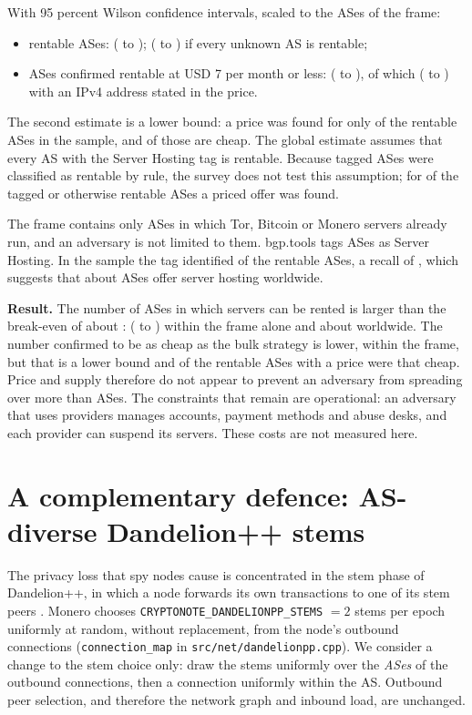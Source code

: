 \documentclass[english]{mrl}
\theoremstyle{plain}
\begin{document}
With 95 percent Wilson confidence intervals, scaled to the \svFrame{} ASes of the frame:
\begin{itemize}
\item rentable ASes: \svKR{} (\svKRLoLo{} to \svKRHiHi{}); \svKRU{} (\svKRULoLo{} to \svKRUHiHi{}) if every unknown AS is rentable;
\item ASes confirmed rentable at USD 7 per month or less: \svKCheap{} (\svKCheapLoLo{} to \svKCheapHiHi{}), of which \svKCheapV{} (\svKCheapVLoLo{} to \svKCheapVHiHi{}) with an IPv4 address stated in the price.
\end{itemize}
The second estimate is a lower bound: a price was found for only \svPriced{} of the \svR{} rentable ASes in the sample, and \svCheap{} of those \svPriced{} are cheap. The global estimate assumes that every AS with the Server Hosting tag is rentable. Because tagged ASes were classified as rentable by rule, the survey does not test this assumption; for \svPriced{} of the tagged or otherwise rentable ASes a priced offer was found.

The frame contains only ASes in which Tor, Bitcoin or Monero servers already run, and an adversary is not limited to them. bgp.tools tags \svVpshTotal{} ASes as Server Hosting. In the sample the tag identified \svTaggedinSample{} of the \svR{} rentable ASes, a recall of \svTagRecall, which suggests that about \svKGlobalHosting{} ASes offer server hosting worldwide.

\textbf{Result.} The number of ASes in which servers can be rented is larger than the break-even of about \kBreakEven{}: \svKR{} (\svKRLoLo{} to \svKRHiHi) within the frame alone and about \svKGlobalHosting{} worldwide. The number confirmed to be as cheap as the bulk strategy is lower, \svKCheap{} within the frame, but that is a lower bound and \svCheap{} of the \svPriced{} rentable ASes with a price were that cheap. Price and supply therefore do not appear to prevent an adversary from spreading over more than \kBreakEven{} ASes. The constraints that remain are operational: an adversary that uses \kBreakEven{} providers manages \kBreakEven{} accounts, payment methods and abuse desks, and each provider can suspend its servers. These costs are not measured here.

\section{A complementary defence: AS-diverse Dandelion++ stems\label{sec:stem}}

The privacy loss that spy nodes cause is concentrated in the stem phase of Dandelion++, in which a node forwards its own transactions to one of its stem peers \cite{Fanti2018a}. Monero chooses \texttt{CRYPTONOTE\_DANDELIONPP\_STEMS} $=2$ stems per epoch uniformly at random, without replacement, from the node's outbound connections (\texttt{connection\_map} in \texttt{src/net/dandelionpp.cpp}). We consider a change to the stem choice only: draw the stems uniformly over the \emph{ASes} of the outbound connections, then a connection uniformly within the AS. Outbound peer selection, and therefore the network graph and inbound load, are unchanged.
\end{document}
